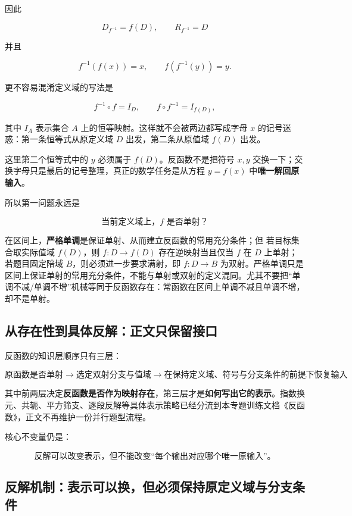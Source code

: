 \documentclass[11pt,a4paper]{ctexart}
\begin{document}
因此

\[
\boxed{
D_{f^{-1}}=f(D),
\qquad
R_{f^{-1}}=D
}
\]

并且

\[
\boxed{
f^{-1}(f(x))=x,
\qquad
f(f^{-1}(y))=y.
}
\]

更不容易混淆定义域的写法是

\[
\boxed{
f^{-1}\circ f=I_D,
\qquad
f\circ f^{-1}=I_{f(D)},
}
\]

其中 \(I_A\) 表示集合 \(A\) 上的恒等映射。这样就不会被两边都写成字母 \(x\) 的记号迷惑：第一条恒等式从原定义域 \(D\) 出发，第二条从原值域 \(f(D)\) 出发。

这里第二个恒等式中的 \(y\) 必须属于 \(f(D)\)。反函数不是把符号
\(x,y\) 交换一下；交换字母只是最后的记号整理，真正的数学任务是从方程
\(y=f(x)\) 中\textbf{唯一解回原输入}。

所以第一问题永远是

\[
\boxed{\text{当前定义域上，}f\text{ 是否单射？}}
\]

在区间上，\textbf{严格单调}是保证单射、从而建立反函数的常用充分条件；但
若目标集合取实际值域 \(f(D)\)，则 \(f:D\to f(D)\) 存在逆映射当且仅当 \(f\) 在 \(D\) 上单射；若题目固定陪域 \(B\)，则必须进一步要求满射，即 \(f:D\to B\) 为双射。严格单调只是区间上保证单射的常用充分条件，不能与单射或双射的定义混同。尤其不要把“单调不减/单调不增”机械等同于反函数存在：常函数在区间上单调不减且单调不增，却不是单射。

\subsection{从存在性到具体反解：正文只保留接口}

反函数的知识层顺序只有三层：

\[
\boxed{
\text{原函数是否单射}
\to
\text{选定双射分支与值域}
\to
\text{在保持定义域、符号与分支条件的前提下恢复输入}
}.
\]

其中前两层决定\textbf{反函数是否作为映射存在}，第三层才是\textbf{如何写出它的表示}。指数换元、共轭、平方筛支、逐段反解等具体表示策略已经分流到本专题训练文档《反函数》，正文不再维护一份并行题型流程。

核心不变量仍是：

\[
\boxed{
\text{反解可以改变表示，但不能改变``每个输出对应哪个唯一原输入''。}
}
\]

\subsection{反解机制：表示可以换，但必须保持原定义域与分支条件}
\end{document}
